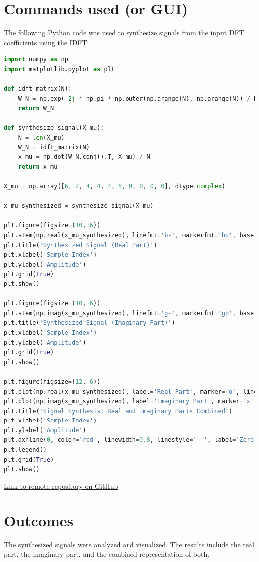 \documentclass[12pt]{article}
\begin{document}
\section{Commands used (or GUI)}
The following Python code was used to synthesize signals from the input DFT coefficients using the IDFT:

\begin{lstlisting}[language=Python, breaklines=true]
import numpy as np
import matplotlib.pyplot as plt

def idft_matrix(N):
    W_N = np.exp(-2j * np.pi * np.outer(np.arange(N), np.arange(N)) / N)
    return W_N

def synthesize_signal(X_mu):
    N = len(X_mu)
    W_N = idft_matrix(N)
    x_mu = np.dot(W_N.conj().T, X_mu) / N
    return x_mu

X_mu = np.array([6, 2, 4, 4, 4, 5, 0, 0, 0, 0], dtype=complex)

x_mu_synthesized = synthesize_signal(X_mu)

plt.figure(figsize=(10, 6))
plt.stem(np.real(x_mu_synthesized), linefmt='b-', markerfmt='bo', basefmt='r-')
plt.title('Synthesized Signal (Real Part)')
plt.xlabel('Sample Index')
plt.ylabel('Amplitude')
plt.grid(True)
plt.show()

plt.figure(figsize=(10, 6))
plt.stem(np.imag(x_mu_synthesized), linefmt='g-', markerfmt='go', basefmt='r-')
plt.title('Synthesized Signal (Imaginary Part)')
plt.xlabel('Sample Index')
plt.ylabel('Amplitude')
plt.grid(True)
plt.show()

plt.figure(figsize=(12, 6))
plt.plot(np.real(x_mu_synthesized), label='Real Part', marker='o', linestyle='-', color='b')
plt.plot(np.imag(x_mu_synthesized), label='Imaginary Part', marker='x', linestyle='--', color='g')
plt.title('Signal Synthesis: Real and Imaginary Parts Combined')
plt.xlabel('Sample Index')
plt.ylabel('Amplitude')
plt.axhline(0, color='red', linewidth=0.8, linestyle='--', label='Zero Line')
plt.legend()
plt.grid(True)
plt.show()

\end{lstlisting}
\item \href{https://github.com/DariaKrecichwostQA/StudiaUBB/tree/main/Digital%20Signal%20Processing/Zad1}{{Link to remote repository on GitHub}}

\newpage
\section{Outcomes}
The synthesized signals were analyzed and visualized. The results include the real part, the imaginary part, and the combined representation of both.
\end{document}
